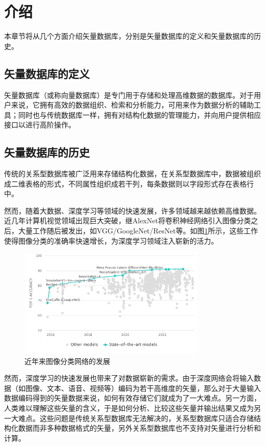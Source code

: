 \section{介绍}

本章节将从几个方面介绍矢量数据库，分别是矢量数据库的定义和矢量数据库的历史。

\subsection{矢量数据库的定义}

矢量数据库（或称向量数据库）是专门用于存储和处理高维数据的数据库。对于用户来说，它拥有高效的数据组织、检索和分析能力，可用来作为数据分析的辅助工具；同时也与传统数据库一样，拥有对结构化数据的管理能力，并向用户提供相应接口以进行高阶操作。

\subsection{矢量数据库的历史}

传统的关系型数据库被广泛用来存储结构化数据，在关系型数据库中，数据被组织成二维表格的形式，不同属性组织成若干列，每条数据则以字段形式存在表格行中。

然而，随着大数据、深度学习等领域的快速发展，许多领域越来越依赖高维数据。近几年计算机视觉领域出现巨大突破，继AlexNet将卷积神经网络引入图像分类之后，大量工作随后被发出，如VGG/GoogleNet/ResNet等。如图\ref{fig:imagenet}所示，这些工作使得图像分类的准确率快速增长，为深度学习领域注入崭新的活力。

\begin{figure}[H]
    \includegraphics[width=0.8\textwidth]{examples/imagenet.pdf}
    \centering
    \caption{近年来图像分类网络的发展}
    \label{fig:imagenet}
\end{figure}

然而，深度学习的快速发展也带来了对数据崭新的需求。由于深度网络会将输入数据（如图像、文本、语音、视频等）编码为若干高维度的矢量，那么对于大量输入数据编码得到的矢量数据来说，如何有效存储它们就成为了一大难点。另一方面，人类难以理解这些矢量的含义，于是如何分析、比较这些矢量并输出结果又成为另一大难点。这些问题是传统关系型数据库无法解决的，关系型数据库只适合存储结构化数据而非多种数据格式的矢量，另外关系型数据库也不支持对矢量进行分析和计算。

